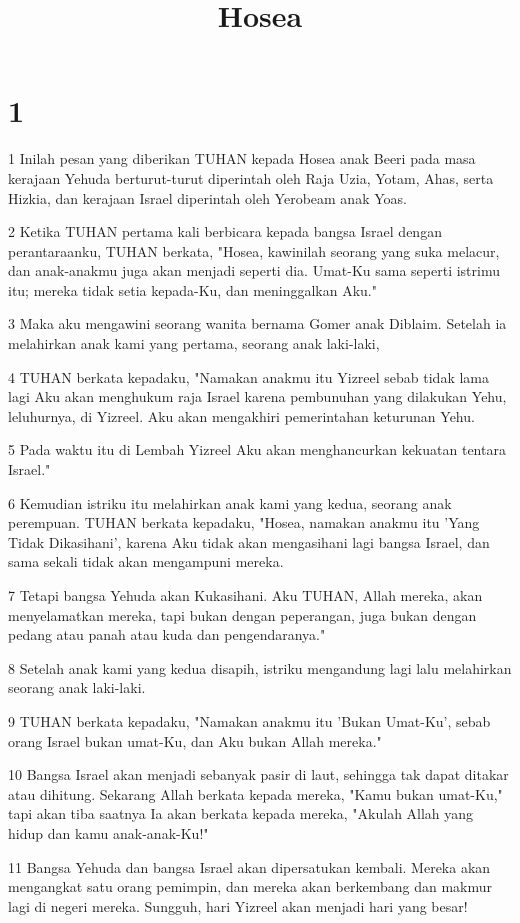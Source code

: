

\title{Hosea}


\chapter{1}

\par 1 Inilah pesan yang diberikan TUHAN kepada Hosea anak Beeri pada masa kerajaan Yehuda berturut-turut diperintah oleh Raja Uzia, Yotam, Ahas, serta Hizkia, dan kerajaan Israel diperintah oleh Yerobeam anak Yoas.
\par 2 Ketika TUHAN pertama kali berbicara kepada bangsa Israel dengan perantaraanku, TUHAN berkata, "Hosea, kawinilah seorang yang suka melacur, dan anak-anakmu juga akan menjadi seperti dia. Umat-Ku sama seperti istrimu itu; mereka tidak setia kepada-Ku, dan meninggalkan Aku."
\par 3 Maka aku mengawini seorang wanita bernama Gomer anak Diblaim. Setelah ia melahirkan anak kami yang pertama, seorang anak laki-laki,
\par 4 TUHAN berkata kepadaku, "Namakan anakmu itu Yizreel sebab tidak lama lagi Aku akan menghukum raja Israel karena pembunuhan yang dilakukan Yehu, leluhurnya, di Yizreel. Aku akan mengakhiri pemerintahan keturunan Yehu.
\par 5 Pada waktu itu di Lembah Yizreel Aku akan menghancurkan kekuatan tentara Israel."
\par 6 Kemudian istriku itu melahirkan anak kami yang kedua, seorang anak perempuan. TUHAN berkata kepadaku, "Hosea, namakan anakmu itu 'Yang Tidak Dikasihani', karena Aku tidak akan mengasihani lagi bangsa Israel, dan sama sekali tidak akan mengampuni mereka.
\par 7 Tetapi bangsa Yehuda akan Kukasihani. Aku TUHAN, Allah mereka, akan menyelamatkan mereka, tapi bukan dengan peperangan, juga bukan dengan pedang atau panah atau kuda dan pengendaranya."
\par 8 Setelah anak kami yang kedua disapih, istriku mengandung lagi lalu melahirkan seorang anak laki-laki.
\par 9 TUHAN berkata kepadaku, "Namakan anakmu itu 'Bukan Umat-Ku', sebab orang Israel bukan umat-Ku, dan Aku bukan Allah mereka."
\par 10 Bangsa Israel akan menjadi sebanyak pasir di laut, sehingga tak dapat ditakar atau dihitung. Sekarang Allah berkata kepada mereka, "Kamu bukan umat-Ku," tapi akan tiba saatnya Ia akan berkata kepada mereka, "Akulah Allah yang hidup dan kamu anak-anak-Ku!"
\par 11 Bangsa Yehuda dan bangsa Israel akan dipersatukan kembali. Mereka akan mengangkat satu orang pemimpin, dan mereka akan berkembang dan makmur lagi di negeri mereka. Sungguh, hari Yizreel akan menjadi hari yang besar!

